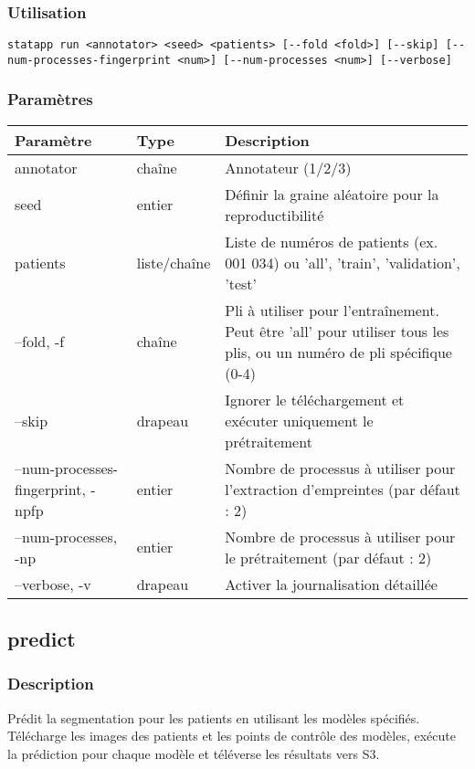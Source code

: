 \documentclass{article}
\begin{document}
\subsubsection{Utilisation}
\begin{lstlisting}
statapp run <annotator> <seed> <patients> [--fold <fold>] [--skip] [--num-processes-fingerprint <num>] [--num-processes <num>] [--verbose]
\end{lstlisting}

\subsubsection{Paramètres}
\begin{tabulary}{\linewidth}{LLL}
\toprule
\textbf{Paramètre} & \textbf{Type} & \textbf{Description} \\
\midrule
annotator & chaîne & Annotateur (1/2/3) \\
seed & entier & Définir la graine aléatoire pour la reproductibilité \\
patients & liste/chaîne & Liste de numéros de patients (ex. 001 034) ou 'all', 'train', 'validation', 'test' \\
--fold, -f & chaîne & Pli à utiliser pour l'entraînement. Peut être 'all' pour utiliser tous les plis, ou un numéro de pli spécifique (0-4) \\
--skip & drapeau & Ignorer le téléchargement et exécuter uniquement le prétraitement \\
--num-processes-fingerprint, -npfp & entier & Nombre de processus à utiliser pour l'extraction d'empreintes (par défaut : 2) \\
--num-processes, -np & entier & Nombre de processus à utiliser pour le prétraitement (par défaut : 2) \\
--verbose, -v & drapeau & Activer la journalisation détaillée \\
\bottomrule
\end{tabulary}

\subsection{predict}
\subsubsection{Description}
Prédit la segmentation pour les patients en utilisant les modèles spécifiés. Télécharge les images des patients et les points de contrôle des modèles, exécute la prédiction pour chaque modèle et téléverse les résultats vers S3.
\end{document}
